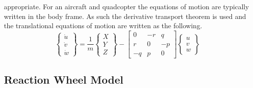 \documentclass{article}
\begin{document}
appropriate. For an aircraft and quadcopter the equations of motion
are typically written in the body frame. As such the derivative
transport theorem is used and the translational equations of motion
are written as the following.
\begin{equation}\label{e:uvwdot} 
\begin{Bmatrix} \dot{u} \\ \dot{v} \\ \dot{w} \end{Bmatrix} = 
\frac{1}m \begin{Bmatrix} X\\Y\\Z\end{Bmatrix}-\begin{bmatrix} 0 & -r
& q \\ r & 0 & -p \\ -q & p & 0 \end{bmatrix} \begin{Bmatrix} u\\v\\w\end{Bmatrix}
\end{equation}

\subsection{Reaction Wheel Model}
\end{document}
